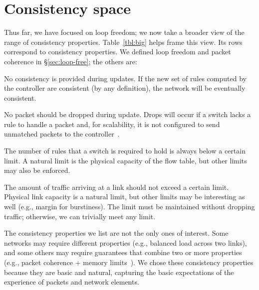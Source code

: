 \section{Consistency space}
\label{sec:table}

Thus far, we have focused on loop freedom; we now take a broader view of the range of consistency properties. Table~\ref{tbl:big} helps frame this view. Its rows correspond to consistency properties. We defined loop freedom and packet coherence in \S\ref{sec:loop-free}; the others are:

 No consistency is provided during updates. If the new set of rules computed by the controller are consistent (by any definition), the network will be eventually consistent.

 No packet should be dropped during update. Drops will occur if a switch lacks a rule to handle a packet and, for scalability, it is not configured to send unmatched packets to the controller~\cite{swan,b4}.



 The number of rules that a switch is required to hold is always below a certain limit. A natural limit is the physical capacity of the flow table, but other limits may also be enforced.

 The amount of traffic arriving at a link should not exceed a certain limit. Physical link capacity is a natural limit, but other limits may be interesting as well (e.g., margin for burstiness). The limit must be maintained without dropping traffic; otherwise, we can trivially meet any limit.

The consistency properties we list are not the only ones of interest.
Some networks may require different properties (e.g., balanced load across two links), and some others may require  guarantees that combine two or more properties (e.g., packet coherence + memory limits~\cite{naga}). We chose these consistency properties because they are basic and natural, capturing the basic expectations of the experience of packets and network elements.

